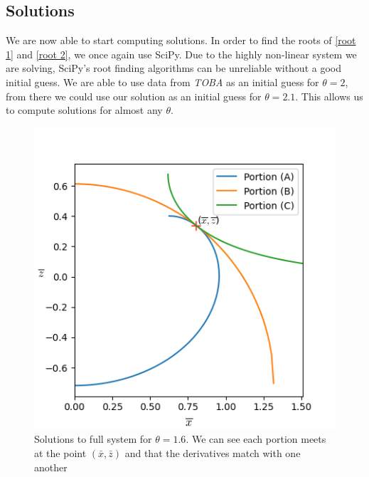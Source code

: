 \subsection{Solutions}
We are now able to start computing solutions. In order to find the roots of \ref{root 1} and \ref{root 2}, we once again use SciPy. Due to the highly non-linear system we are solving, SciPy's root finding algorithms can be unreliable without a good initial guess. We are able to use data from \textit{TOBA} \cite{toba1959drop} as an initial guess for $\theta=2$, from there we could use our solution as an initial guess for $\theta=2.1$. This allows us to compute solutions for almost any $\theta$.

\begin{figure}
    \centering
    \includegraphics[width=0.85\linewidth]{WriteUp/images/combined theta=1.6.png}
    \caption{Solutions to full system for $\theta=1.6$. We can see each portion meets at the point $(\bar{x},\bar{z})$ and that the derivatives match with one another}
    \label{fig:8}
\end{figure}

